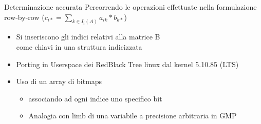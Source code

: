\begin{frame} {Determinazione accurata}
Percorrendo le operazioni effettuate nella formulazione row-by-row	
($c_{i*} = \sum\limits_{k \in I_i(A)}  a_{ik} \ast  b_{k*}$)
\begin{itemize}
	\item	Si inseriscono gli indici relativi alla matrice B \\
	come chiavi in una struttura indicizzata
	\pause
	\item	Porting in Userspace dei RedBlack Tree linux dal kernel 5.10.85 (LTS)
	\pause
	\item	Uso di un array di bitmaps
	\begin{itemize}
		\item	associando ad ogni indice uno specifico bit
		\item	Analogia con limb di una variabile a precisione arbitraria in GMP
	\end{itemize}
\end{itemize}
\end{frame}


